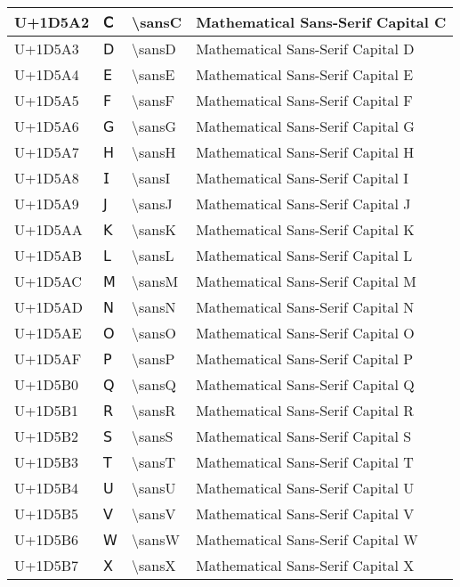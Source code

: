 \begin{table}[h]
\begin{tabulary}{\linewidth}{|L|L|L|L|}
\hline
U+1D5A2 & 𝖢 & {\textbackslash}sansC & Mathematical Sans-Serif Capital C \\
\hline
U+1D5A3 & 𝖣 & {\textbackslash}sansD & Mathematical Sans-Serif Capital D \\
\hline
U+1D5A4 & 𝖤 & {\textbackslash}sansE & Mathematical Sans-Serif Capital E \\
\hline
U+1D5A5 & 𝖥 & {\textbackslash}sansF & Mathematical Sans-Serif Capital F \\
\hline
U+1D5A6 & 𝖦 & {\textbackslash}sansG & Mathematical Sans-Serif Capital G \\
\hline
U+1D5A7 & 𝖧 & {\textbackslash}sansH & Mathematical Sans-Serif Capital H \\
\hline
U+1D5A8 & 𝖨 & {\textbackslash}sansI & Mathematical Sans-Serif Capital I \\
\hline
U+1D5A9 & 𝖩 & {\textbackslash}sansJ & Mathematical Sans-Serif Capital J \\
\hline
U+1D5AA & 𝖪 & {\textbackslash}sansK & Mathematical Sans-Serif Capital K \\
\hline
U+1D5AB & 𝖫 & {\textbackslash}sansL & Mathematical Sans-Serif Capital L \\
\hline
U+1D5AC & 𝖬 & {\textbackslash}sansM & Mathematical Sans-Serif Capital M \\
\hline
U+1D5AD & 𝖭 & {\textbackslash}sansN & Mathematical Sans-Serif Capital N \\
\hline
U+1D5AE & 𝖮 & {\textbackslash}sansO & Mathematical Sans-Serif Capital O \\
\hline
U+1D5AF & 𝖯 & {\textbackslash}sansP & Mathematical Sans-Serif Capital P \\
\hline
U+1D5B0 & 𝖰 & {\textbackslash}sansQ & Mathematical Sans-Serif Capital Q \\
\hline
U+1D5B1 & 𝖱 & {\textbackslash}sansR & Mathematical Sans-Serif Capital R \\
\hline
U+1D5B2 & 𝖲 & {\textbackslash}sansS & Mathematical Sans-Serif Capital S \\
\hline
U+1D5B3 & 𝖳 & {\textbackslash}sansT & Mathematical Sans-Serif Capital T \\
\hline
U+1D5B4 & 𝖴 & {\textbackslash}sansU & Mathematical Sans-Serif Capital U \\
\hline
U+1D5B5 & 𝖵 & {\textbackslash}sansV & Mathematical Sans-Serif Capital V \\
\hline
U+1D5B6 & 𝖶 & {\textbackslash}sansW & Mathematical Sans-Serif Capital W \\
\hline
U+1D5B7 & 𝖷 & {\textbackslash}sansX & Mathematical Sans-Serif Capital X \\

\end{tabulary}
\end{table}
